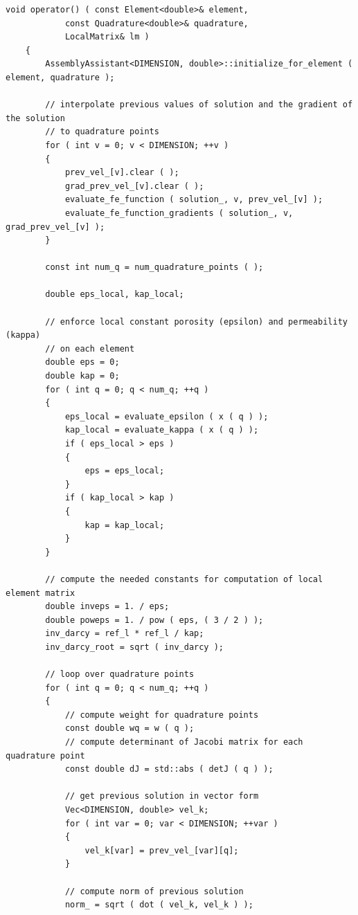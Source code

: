 \documentclass{article}
\begin{document}
\begin{lstlisting}[firstnumber=264]
    void operator() ( const Element<double>& element,
            const Quadrature<double>& quadrature,
            LocalMatrix& lm )
    {
        AssemblyAssistant<DIMENSION, double>::initialize_for_element ( element, quadrature );

        // interpolate previous values of solution and the gradient of the solution
        // to quadrature points
        for ( int v = 0; v < DIMENSION; ++v )
        {
            prev_vel_[v].clear ( );
            grad_prev_vel_[v].clear ( );
            evaluate_fe_function ( solution_, v, prev_vel_[v] );
            evaluate_fe_function_gradients ( solution_, v, grad_prev_vel_[v] );
        }

        const int num_q = num_quadrature_points ( );

        double eps_local, kap_local;

        // enforce local constant porosity (epsilon) and permeability (kappa)
        // on each element
        double eps = 0;
        double kap = 0;
        for ( int q = 0; q < num_q; ++q )
        {
            eps_local = evaluate_epsilon ( x ( q ) );
            kap_local = evaluate_kappa ( x ( q ) );
            if ( eps_local > eps )
            {
                eps = eps_local;
            }
            if ( kap_local > kap )
            {
                kap = kap_local;
            }
        }

        // compute the needed constants for computation of local element matrix
        double inveps = 1. / eps;
        double poweps = 1. / pow ( eps, ( 3 / 2 ) );
        inv_darcy = ref_l * ref_l / kap;
        inv_darcy_root = sqrt ( inv_darcy );

        // loop over quadrature points
        for ( int q = 0; q < num_q; ++q )
        {
            // compute weight for quadrature points
            const double wq = w ( q );
            // compute determinant of Jacobi matrix for each quadrature point
            const double dJ = std::abs ( detJ ( q ) );

            // get previous solution in vector form
            Vec<DIMENSION, double> vel_k;
            for ( int var = 0; var < DIMENSION; ++var )
            {
                vel_k[var] = prev_vel_[var][q];
            }

            // compute norm of previous solution
            norm_ = sqrt ( dot ( vel_k, vel_k ) );


\end{lstlisting}
\end{document}
